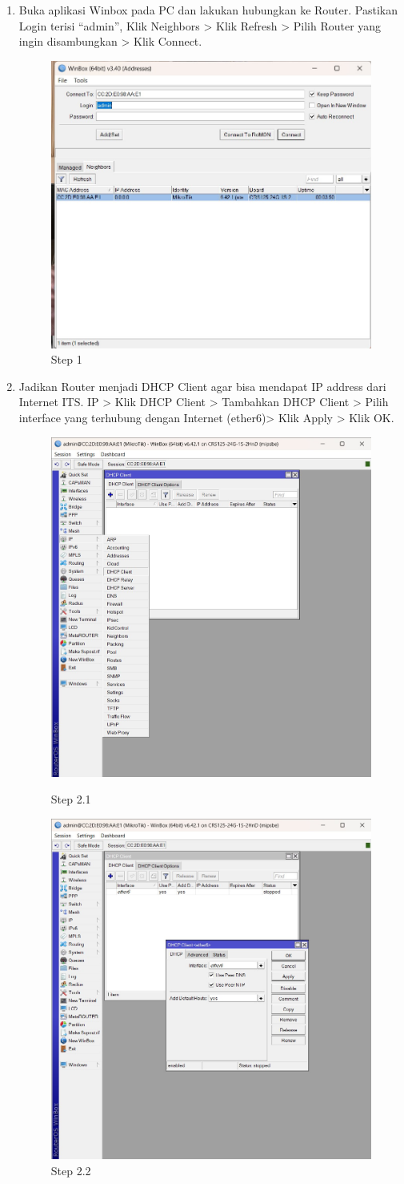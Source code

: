 \begin{enumerate}
	\item Buka aplikasi Winbox pada PC dan lakukan hubungkan ke Router. Pastikan Login terisi “admin”,
	Klik Neighbors > Klik Refresh > Pilih Router yang ingin disambungkan > Klik Connect.
	
	\begin{figure}[H]
		\centering
		\includegraphics[width=0.5\linewidth]{P3/img/step1.jpg}
		\caption{Step 1}
		\label{fig:gambar1}
	\end{figure}

	\item  Jadikan Router menjadi DHCP Client agar bisa mendapat IP address dari Internet ITS. IP >
	Klik DHCP Client > Tambahkan DHCP Client > Pilih interface yang terhubung dengan Internet
	(ether6)> Klik Apply > Klik OK.
	\begin{figure}[H]
		\centering
		\includegraphics[width=0.5\linewidth]{P3/img/step2.jpg}
		\caption{Step 2.1}
		\label{fig:gambar2.1}

		\centering
		\includegraphics[width=0.5\linewidth]{P3/img/step2.2.jpg}
		\caption{Step 2.2}
		\label{fig:gambar2.2}
	\end{figure}


\end{enumerate}
